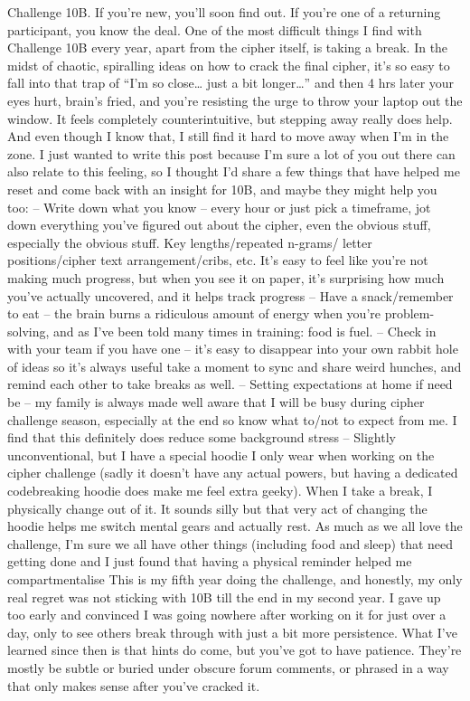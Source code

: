 
Challenge 10B. If you’re new, you’ll soon find out. If you’re one of a returning participant, you know the deal. 
One of the most difficult things I find with Challenge 10B every year, apart from the cipher itself, is taking a break. In the midst of chaotic, spiralling ideas on how to crack the final cipher, it’s so easy to fall into that trap of “I’m so close… just a bit longer…” and then 4 hrs later your eyes hurt, brain’s fried, and you’re resisting the urge to throw your laptop out the window. 
It feels completely counterintuitive, but stepping away really does help. And even though I know that, I still find it hard to move away when I’m in the zone. I just wanted to write this post because I’m sure a lot of you out there can also relate to this feeling, so I thought I’d share a few things that have helped me reset and come back with an insight for 10B, and maybe they might help you too: 
– Write down what you know – every hour or just pick a timeframe, jot down everything you’ve figured out about the cipher, even the obvious stuff, especially the obvious stuff. Key lengths/repeated n-grams/ letter positions/cipher text arrangement/cribs, etc. It’s easy to feel like you’re not making much progress, but when you see it on paper, it’s surprising how much you’ve actually uncovered, and it helps track progress
– Have a snack/remember to eat – the brain burns a ridiculous amount of energy when you’re problem-solving, and as I’ve been told many times in training: food is fuel.
– Check in with your team if you have one – it’s easy to disappear into your own rabbit hole of ideas so it’s always useful take a moment to sync and share weird hunches, and remind each other to take breaks as well.
– Setting expectations at home if need be – my family is always made well aware that I will be busy during cipher challenge season, especially at the end so know what to/not to expect from me. I find that this definitely does reduce some background stress 
– Slightly unconventional, but I have a special hoodie I only wear when working on the cipher challenge (sadly it doesn’t have any actual powers, but having a dedicated codebreaking hoodie does make me feel extra geeky). When I take a break, I physically change out of it. It sounds silly but that very act of changing the hoodie helps me switch mental gears and actually rest. As much as we all love the challenge, I’m sure we all have other things (including food and sleep) that need getting done and I just found that having a physical reminder helped me compartmentalise 
This is my fifth year doing the challenge, and honestly, my only real regret was not sticking with 10B till the end in my second year. I gave up too early and convinced I was going nowhere after working on it for just over a day, only to see others break through with just a bit more persistence. What I’ve learned since then is that hints do come, but you’ve got to have patience. They’re mostly be subtle or buried under obscure forum comments, or phrased in a way that only makes sense after you’ve cracked it. 
